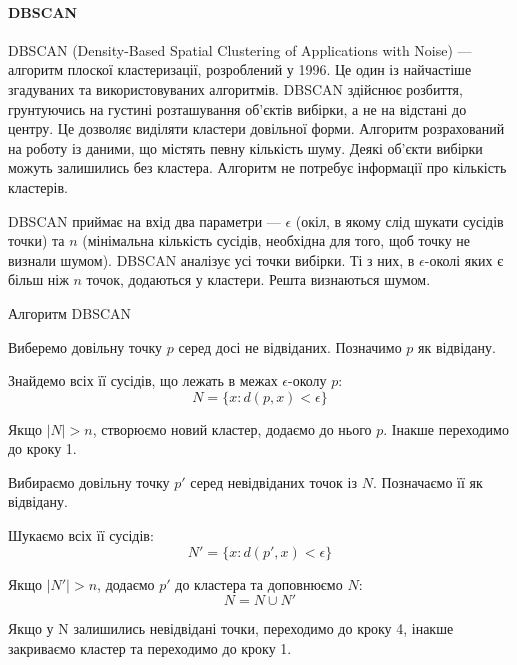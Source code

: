         \paragraph {DBSCAN}
        
            DBSCAN (Density-Based Spatial Clustering of Applications with Noise) \cite{DBSCAN} --- алгоритм плоскої кластеризації, розроблений у 1996. Це один із найчастіше згадуваних та використовуваних алгоритмів. DBSCAN здійснює розбиття, грунтуючись на густині розташування об'єктів вибірки, а не на відстані до центру. Це дозволяє виділяти кластери довільної форми. Алгоритм розрахований на роботу із даними, що містять певну кількість шуму. Деякі об'єкти вибірки можуть залишились без кластера. Алгоритм не потребує інформації про кількість кластерів.
            
            DBSCAN приймає на вхід два параметри --- $\epsilon$ (окіл, в якому слід шукати сусідів точки) та $n$ (мінімальна кількість сусідів, необхідна для того, щоб точку не визнали шумом). DBSCAN аналізує усі точки вибірки. Ті з них, в $\epsilon$-околі яких є більш ніж $n$ точок, додаються у кластери. Решта визнаються шумом.
            
            \begin{algorithm}
                \caption{Алгоритм DBSCAN}
                \enumerate
                    \item Виберемо довільну точку $p$ серед досі не відвіданих. Позначимо $p$ як відвідану.
                    \item Знайдемо всіх її сусідів, що лежать в межах $\epsilon$-околу $p$:
                        \[
                            N = \{x : d(p, x) < \epsilon\}
                        \]
                    \item Якщо $\mid N \mid > n$, створюємо новий кластер, додаємо до нього $p$. Інакше переходимо до кроку 1.
                    \item Вибираємо довільну точку $p'$ серед невідвіданих точок із $N$. Позначаємо її як відвідану.
                    \item Шукаємо всіх її сусідів:
                        \[
                            N' = \{x : d(p', x) < \epsilon\}
                        \]
                    \item Якщо $\mid N' \mid > n$, додаємо $p'$ до кластера та доповнюємо $N$:
                        \[
                            N = N \cup N'
                        \]
                    \item Якщо у N залишились невідвідані точки, переходимо до кроку 4, інакше закриваємо кластер та переходимо до кроку 1.
            \end{algorithm}
            
